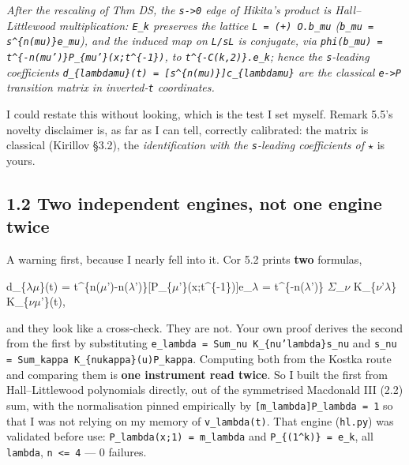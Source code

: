 \documentclass[11pt,a4paper]{article}
\begin{document}
\emph{After the rescaling of Thm DS, the \mbox{\texttt{s->0}} edge of Hikita's product is Hall--Littlewood multiplication: \mbox{\texttt{E\_k}} preserves the lattice \mbox{\texttt{L = (+) O.b\_mu}} (\mbox{\texttt{b\_mu = s\textasciicircum{}\{n(mu)\}e\_mu}}), and the induced map on \mbox{\texttt{L/sL}} is conjugate, via \mbox{\texttt{phi(b\_mu) = t\textasciicircum{}\{-n(mu')\}P\_\{mu'\}(x;t\textasciicircum{}\{-1\})}}, to \mbox{\texttt{t\textasciicircum{}\{-C(k,2)\}.e\_k}}; hence the \mbox{\texttt{s}}-leading coefficients \mbox{\texttt{d\_\{lambdamu\}(t) = [s\textasciicircum{}\{n(mu)\}]c\_\{lambdamu\}}} are the classical \mbox{\texttt{e->P}} transition matrix in inverted-\mbox{\texttt{t}} coordinates.}

I could restate this without looking, which is the test I set myself. Remark 5.5's novelty disclaimer is, as far as I can tell, correctly calibrated: the matrix is classical (Kirillov \S{}3.2), the \emph{identification with the \mbox{\texttt{s}}-leading coefficients of $\star$} is yours.

\subsection*{1.2 Two independent engines, not one engine twice}

A warning first, because I nearly fell into it. Cor 5.2 prints \textbf{two} formulas,

    d\_\{$\lambda$$\mu$\}(t) = t\textasciicircum{}\{n($\mu$')-n($\lambda$')\}[P\_\{$\mu$'\}(x;t\textasciicircum{}\{-1\})]e\_$\lambda$ = t\textasciicircum{}\{-n($\lambda$')\} $\Sigma$\_$\nu$ K\_\{$\nu$'$\lambda$\} K\_\{$\nu$$\mu$'\}(t),

and they look like a cross-check. They are not. Your own proof derives the second from the first by substituting \mbox{\texttt{e\_lambda = Sum\_nu K\_\{nu'lambda\}s\_nu}} and \mbox{\texttt{s\_nu = Sum\_kappa K\_\{nukappa\}(u)P\_kappa}}. Computing both from the Kostka route and comparing them is \textbf{one instrument read twice}. So I built the first from Hall--Littlewood polynomials directly, out of the symmetrised Macdonald III (2.2) sum, with the normalisation pinned empirically by \mbox{\texttt{[m\_lambda]P\_lambda = 1}} so that I was not relying on my memory of \mbox{\texttt{v\_lambda(t)}}. That engine (\mbox{\texttt{hl.py}}) was validated before use: \mbox{\texttt{P\_lambda(x;1) = m\_lambda}} and \mbox{\texttt{P\_\{(1\textasciicircum{}k)\} = e\_k}}, all \mbox{\texttt{lambda}}, \mbox{\texttt{n <= 4}} --- 0 failures.
\end{document}
